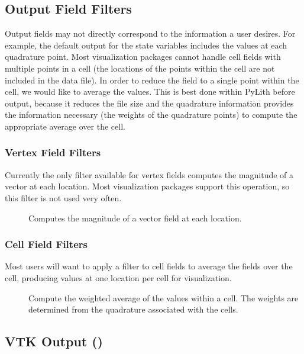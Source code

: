 \subsection{Output Field Filters}

Output fields may not directly correspond to the information a user
desires. For example, the default output for the state variables
includes the values at each quadrature point. Most visualization
packages cannot handle cell fields with multiple points in a cell (the
locations of the points within the cell are not included in the data
file). In order to reduce the field to a single point within the cell,
we would like to average the values. This is best done within PyLith
before output, because it reduces the file size and the quadrature
information provides the information necessary (the weights of the
quadrature points) to compute the appropriate average over the cell.

\subsubsection{Vertex Field Filters}
\label{sub:vertex:field:filters}

Currently the only filter available for vertex fields computes the
magnitude of a vector at each location. Most visualization packages
support this operation, so this filter is not used very often.
\begin{description}
\item [] Computes the magnitude of a vector field
at each location.
\end{description}

\subsubsection{Cell Field Filters}
\label{sub:cell:field:filters}

Most users will want to apply a filter to cell fields to average the
fields over the cell, producing values at one location per cell for
visualization.
\begin{description}
\item [] Compute the weighted average of the values within
a cell. The weights are determined from the quadrature associated
with the cells.
\end{description}

\subsection{VTK Output ()}

